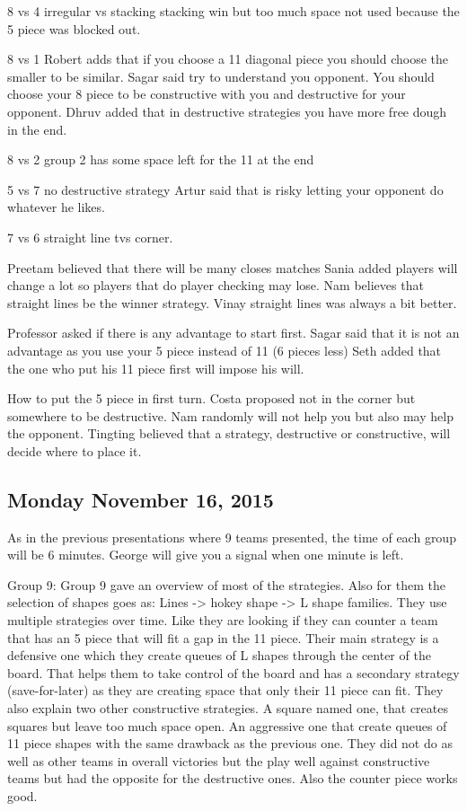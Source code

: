 8 vs 4
irregular vs stacking
stacking win but too much space not used because the 5 piece was blocked out.


8 vs 1
Robert adds that if you choose a 11 diagonal piece you should choose the smaller to be similar.
Sagar said try to understand you opponent. You should choose your 8 piece to be constructive with you and destructive for your opponent.
Dhruv added that in destructive strategies you have more free dough in the end.

8 vs 2
group 2 has some space left for the 11 at the end


5 vs 7
no destructive strategy
Artur said that is risky letting your opponent do whatever he likes.


7 vs 6
straight line tvs corner.

Preetam believed that there will be many closes matches
Sania added players will change a lot so players that do player checking may lose.
Nam believes that straight lines be the winner strategy.
Vinay straight lines was always a bit better.

Professor asked if there is any advantage to start first.
Sagar said  that it is not an advantage as you use your 5 piece instead of 11 (6 pieces less)
Seth added  that the one who put his 11 piece first will impose his will.

How to put the 5 piece in first turn.
Costa proposed not in the corner but somewhere to be destructive.
Nam randomly will not help you but also may help the opponent.
Tingting believed that a strategy, destructive or constructive, will decide where to place it.
\subsection{Monday November 16, 2015}
As in the previous presentations where 9 teams presented, the time of each group
will be 6 minutes. George will give you a signal when one minute is left.

Group 9:
Group 9 gave an overview of most of the strategies. Also for them the selection
of shapes goes as: Lines -> hokey shape -> L shape families. They use multiple 
strategies over time. Like they are looking if they can counter a team that has
an 5 piece that will fit a gap in the 11 piece. Their main strategy is a defensive
one which they create queues of L shapes through the center of the board. That
helps them to take control of the board and has a secondary strategy (save-for-later)
as they are creating space that only their 11 piece can fit. They also explain
two other constructive strategies. A square named one, that creates squares but
leave too much space open. An aggressive one that create queues of 11 piece shapes
with the same drawback as the previous one. They did not do as well as other teams
in overall victories but the play well against constructive teams but had the 
opposite for the destructive ones. Also the counter piece works good.

